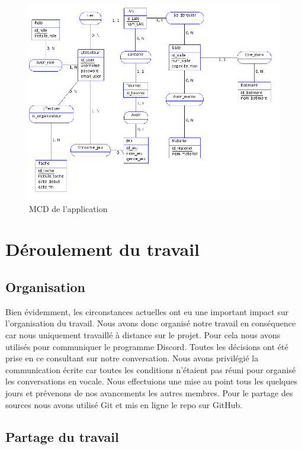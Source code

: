 \documentclass[12pt]{article}
\begin{document}
\begin{figure}[htp]
\centering
\includegraphics[scale=0.50]{images/mcd.png}
\caption{MCD de l'application}
\label{}
\end{figure}

\newpage

\section{Déroulement du travail}

\subsection{Organisation}

Bien évidemment, les circonstances actuelles ont eu une important impact sur l'organisation du travail. Nous avons donc organisé notre travail en conséquence car nous uniquement travaillé à distance sur le projet. Pour cela nous avons utilisés pour communiquer le programme Discord. Toutes les décisions ont été prise en ce consultant sur notre conversation. Nous avons privilégié la communication écrite car toutes les conditions n'étaient pas réuni pour organisé les conversations en vocale. Nous effectuions une mise au point tous les quelques jours et prévenons de nos avancements les autres membres. Pour le partage des sources nous avons utilisé Git et mis en ligne le repo sur GitHub.

\subsection{Partage du travail}
\end{document}
